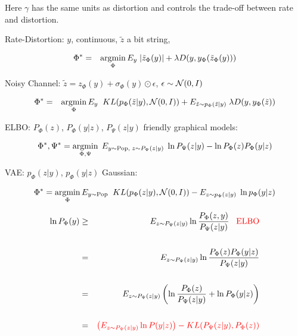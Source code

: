{{\vfill
Here $\gamma$ has the same units as distortion and controls the trade-off between rate and distortion.



Rate-Distortion: $y$, continuous, $\tilde{z}$ a bit string,

{\color{red}
\begin{eqnarray*}
\Phi^* &  = &  \operatorname*{argmin}_\Phi E_y \;|\tilde{z}_\Phi(y)| + \lambda D(y,y_\Phi(\tilde{z}_\Phi(y)))
\end{eqnarray*}
}

\vfill
Noisy Channel: {\color{red} $\tilde{z} = z_\Phi(y) + \sigma_\Phi(y) \odot \epsilon$,\hspace{2em} $\epsilon \sim {\cal N}(0,I)$}

{\color{red}
\begin{eqnarray*}
\Phi^* & = & \operatorname*{argmin}_\Phi E_y\; \;KL(p_\Phi(\tilde{z}|y),{\cal N}(0,I)) + E_{\tilde{z}\sim p_\Phi(\tilde{z}|y)}\;\lambda D(y,y_\Phi(\tilde{z}))
\end{eqnarray*}
}



ELBO: {\color{red} $P_\Phi(z)$, $P_\Phi(y|z)$, $P_\Psi(z|y)$} friendly graphical models:

{\color{red} $$\Phi^*,\Psi^*  =  \operatorname*{argmin}_{\Phi,\Psi}\; E_{y \sim \mathrm{Pop},\;z \sim P_\Psi(z|y)} \;\ln P_\Psi(z|y) - \ln P_\Phi(z)P_\Phi(y|z)$$}

\vfill
VAE: {\color{red} $p_\Phi(z|y)$, $p_\Phi(y|z)$} Gaussian:

{\color{red} $$\Phi^* =  \operatorname*{argmin}_\Phi E_{y \sim \mathrm{Pop}}\; \;KL(p_\Phi(z|y),{\cal N}(0,I))  - E_{z\sim p_\Phi(z|y)}\;\ln p_\Phi(y|z)$$}


}



{\huge
\begin{eqnarray*}
        \ln P_\Phi(y) & \geq & E_{z \sim P_\Psi(z|y)} \ln \frac{P_\Phi(z,y)}{P_\Psi(z|y)}\;\;\;\mbox{\color{red} ELBO} \\
        \\
        & = & E_{z \sim P_\Psi(z|y)} \ln \frac{P_\Phi(z)P_\Phi(y|z)}{P_\Psi(z|y)} \\
        \\
        & = & E_{z \sim P_\Psi(z|y)} \left(\ln \frac{P_\Phi(z)}{P_\Psi(z|y)} +\ln P_\Phi(y|z)\right) \\
        \\
        & = & {\color{red} \left(E_{z \sim P_\Psi(z|y)} \ln P(y|z)\right) - KL(P_\Psi(z|y),P_\Phi(z))}
\end{eqnarray*}
}

}
